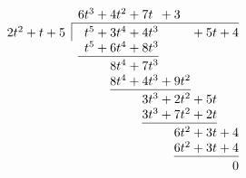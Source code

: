 \documentclass[12pt]{article}
\begin{document}
\[
\begin{array}{r@{}l@{}c@{}r@{}l@{}c@{}rc@{}r@{}l@{}c@{}r@{}l@{}c@{}r@{}l@{}c@{}r@{}l@{}c@{}r@{}l@{}c@{}r@{}}
&&&&&&&& 6 & t^3 & {}+{} & 4 & t^2 & {}+{} & 7 & t & {}+{} & 3 &  &  &  &  &  & \\
\cline{8-24}\rule{0pt}{2.5ex}
2 & t^2 & {}+{} &  & t & {}+{} & 5 & \multicolumn{1}{|l@{}}{}  &  & t^5 & {}+{} & 3 & t^4 & {}+{} & 4 & t^3 &  &  &  & {}+{} & 5 & t & {}+{} & 4 \\
&&&&&& &  &  & t^5 & {}+{} & 6 & t^4 & {}+{} & 8 & t^3 &  &  &  &  &  &  &  &  \\
\cline{9-16}\rule{0pt}{2.5ex}
&&&&&& &  &  &  &  & 8 & t^4 & {}+{} & 7 & t^3 &  &  &  &  &  &  &  &  \\
&&&&&& &  &  &  &  & 8 & t^4 & {}+{} & 4 & t^3 & {}+{} & 9 & t^2 &  &  &  &  &  \\
\cline{12-19}\rule{0pt}{2.5ex}
&&&&&& &  &  &  &  &  &  &  & 3 & t^3 & {}+{} & 2 & t^2 & {}+{} & 5 & t &  &  \\
&&&&&& &  &  &  &  &  &  &  & 3 & t^3 & {}+{} & 7 & t^2 & {}+{} & 2 & t &  &  \\
\cline{15-22}\rule{0pt}{2.5ex}
&&&&&& &  &  &  &  &  &  &  &  &  &  & 6 & t^2 & {}+{} & 3 & t & {}+{} & 4 \\
&&&&&& &  &  &  &  &  &  &  &  &  &  & 6 & t^2 & {}+{} & 3 & t & {}+{} & 4 \\
\cline{18-24}\rule{0pt}{2.5ex}
&&&&&& &  &  &  &  &  &  &  &  &  &  &  &  &  &  &  &  & 0 \\
\end{array}
\]
\end{document}
